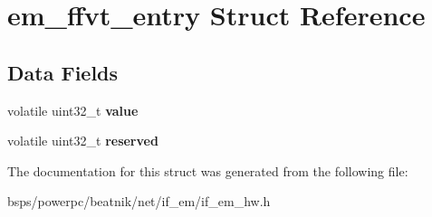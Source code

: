 \hypertarget{structem__ffvt__entry}{}\section{em\+\_\+ffvt\+\_\+entry Struct Reference}
\label{structem__ffvt__entry}
\subsection*{Data Fields}
\begin{DoxyCompactItemize}
\item 
\mbox{\label{structem__ffvt__entry_a9d139a68f43cba568e1c6d66a298a6e8}} 
volatile uint32\+\_\+t {\bfseries value}
\item 
\mbox{\label{structem__ffvt__entry_aa5c2a3fa8ed640bc9943510da5904747}} 
volatile uint32\+\_\+t {\bfseries reserved}
\end{DoxyCompactItemize}


The documentation for this struct was generated from the following file\+:\begin{DoxyCompactItemize}
\item 
bsps/powerpc/beatnik/net/if\+\_\+em/if\+\_\+em\+\_\+hw.\+h\end{DoxyCompactItemize}

